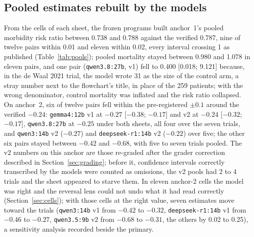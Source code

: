 \documentclass[11pt]{article}
\begin{document}
\subsection{Pooled estimates rebuilt by the models}
From the cells of each sheet, the frozen programs built anchor~1's pooled morbidity risk ratio between 0.738 and 0.788 against the verified 0.787, nine of twelve pairs within 0.01 and eleven within 0.02, every interval crossing 1 as published (Table~\ref{tab:pools}); pooled mortality stayed between 0.980 and 1.078 in eleven pairs, and one pair (\texttt{qwen3.8:27b}, v1) fell to 0.400 [0.018; 9.121] because, in the de Waal 2021 trial, the model wrote 31 as the size of the control arm, a stray number next to the flowchart's title, in place of the 259 patients; with the wrong denominator, control mortality was inflated and the risk ratio collapsed. On anchor~2, six of twelve pairs fell within the pre-registered $\pm0.1$ around the verified $-0.24$: \texttt{gemma4:12b} v1 at $-0.27$ [$-0.38$; $-0.17$] and v2 at $-0.24$ [$-0.32$; $-0.17$], \texttt{qwen3.8:27b} at $-0.25$ under both sheets, all four over the seven trials, and \texttt{qwen3:14b} v2 ($-0.27$) and \texttt{deepseek-r1:14b} v2 ($-0.22$) over five; the other six pairs stayed between $-0.42$ and $-0.68$, with five to seven trials pooled. The v2 numbers on this anchor are those re-graded after the grader correction described in Section~\ref{sec:grading}; before it, confidence intervals correctly transcribed by the models were counted as omissions, the v2 pools had 2 to 4 trials and the sheet appeared to starve them. In eleven anchor-2 cells the model was right and the reversal lens could not undo what it had read correctly (Section~\ref{sec:cells}); with those cells at the right value, seven estimates move toward the trials (\texttt{qwen3:14b} v1 from $-0.42$ to $-0.32$, \texttt{deepseek-r1:14b} v1 from $-0.46$ to $-0.27$, \texttt{qwen3.5:9b} v2 from $-0.68$ to $-0.31$, the others by 0.02 to 0.25), a sensitivity analysis recorded beside the primary.
\end{document}
